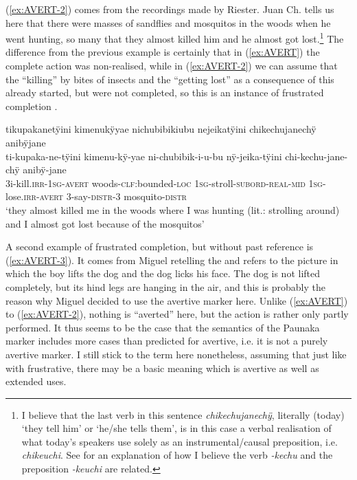 (\ref{ex:AVERT-2}) comes from the recordings made by Riester. Juan Ch. tells us here that there were masses of sandflies and mosquitos in the woods when he went hunting, so many that they almost killed him and he almost got lost.\footnote{I believe that the last verb in this sentence \textit{chikechujanechÿ}, literally (today) ‘they tell him’ or ‘he/she tells them’, is in this case a verbal realisation of what today’s speakers use solely as an instrumental/causal preposition, i.e. \textit{chikeuchi}. See  for an explanation of how I believe the verb \textit{-kechu} and the preposition \textit{-keuchi} are related.} The difference from the previous example is certainly that in (\ref{ex:AVERT}) the complete action was non-realised, while in (\ref{ex:AVERT-2}) we can assume that the “killing” by bites of insects and the “getting lost” as a consequence of this already started, but were not completed, so this is an instance of frustrated completion \citep[cf.][872]{Kuteva2019}.

\ea\label{ex:AVERT-2}
\begingl
\glpreamble tikupakanetÿini kimenukÿyae nichubibikiubu nejeikatÿini chikechujanechÿ anibÿjane\\
\gla ti-kupaka-ne-tÿini kimenu-kÿ-yae ni-chubibik-i-u-bu nÿ-jeika-tÿini chi-kechu-jane-chÿ anibÿ-jane\\
\glb 3i-kill.\textsc{irr}-1\textsc{sg}-\textsc{avert} woods-\textsc{clf:}bounded-\textsc{loc} 1\textsc{sg}-stroll-\textsc{subord}-\textsc{real}-\textsc{mid} 1\textsc{sg}-lose.\textsc{irr}-\textsc{avert} 3-say-\textsc{distr}-3 mosquito-\textsc{distr}\\
\glft ‘they almost killed me in the woods where I was hunting (lit.: strolling around) and I almost got lost because of the mosquitos’
\endgl
\trailingcitation{[nxx-a630101g-1.64-65]}
\xe

A second example of frustrated completion, but without past reference is (\ref{ex:AVERT-3}). It comes from Miguel retelling the  and refers to the picture in which the boy lifts the dog and the dog licks his face. The dog is not lifted completely, but its hind legs are hanging in the air, and this is probably the reason why Miguel decided to use the avertive marker here. Unlike (\ref{ex:AVERT}) to (\ref{ex:AVERT-2}), nothing is “averted” here, but the action is rather only partly performed. It thus seems to be the case that the semantics of the Paunaka marker includes more cases than predicted for avertive, i.e. it is not a purely avertive marker. I still stick to the term here nonetheless, assuming that just like with frustrative, there may be a basic meaning which is avertive as well as extended uses.

